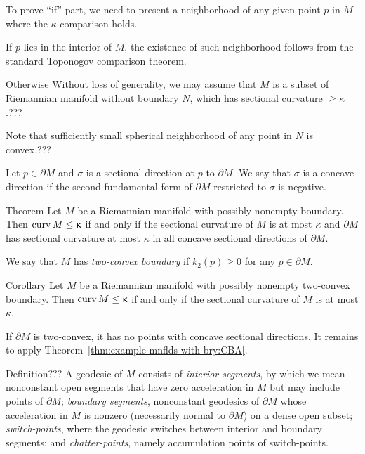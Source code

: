 To prove ``if'' part, we need to present a neighborhood of any given point $p$ in $M$ where the $\kappa$-comparison holds.

If $p$ lies in the interior of $M$, 
the existence of such neighborhood 
follows from the standard Toponogov comparison theorem.

Otherwise 
Without loss of generality, we may assume that $M$ 
is a subset of Riemannian manifold without boundary $N$, 
which has sectional curvature $\ge \kappa$.???

Note that sufficiently small spherical neighborhood of 
any point in $N$ is convex.???\qeds


Let $p\in\partial M$ and $\sigma$ is a sectional direction at $p$ to $\partial M$.
We say that $\sigma$ is a concave direction if the second fundamental form of $\partial M$ restricted to $\sigma$ is negative.

\begin{thm}{Theorem}\label{thm:example-mnflds-with-bry:CBA}
Let $M$ be a Riemannian manifold with possibly nonempty boundary.
Then
$\curv M\le \kappa$
if and only if the sectional curvature of $M$ is at most $\kappa$
and $\partial M$ has sectional curvature at most $\kappa$ 
in all concave sectional directions of $\partial M$.
\end{thm}

We say that $M$ has \emph{two-convex boundary} 
if $k_2(p)\ge 0$ for any $p\in\partial M$.

%

\begin{thm}{Corollary}
Let $M$ be a Riemannian manifold with possibly nonempty two-convex boundary.
Then $\curv M\le{\kappa}$ 
if and only if the sectional curvature of $M$ is at most $\kappa$.
\end{thm}

If $\partial M$ is two-convex, 
it has no points with concave sectional directions.
It remains to apply Theorem~\ref{thm:example-mnflds-with-bry:CBA}.
\qeds

\begin{thm}{Definition}\label{def:mwb-segment}??? A geodesic of $M$ consists of  \emph{interior
segments}, by which we mean nonconstant open segments  that have zero acceleration in $M$ but
may include points of $\partial M$;  \emph{boundary segments}, nonconstant geodesics of $\partial M$ whose acceleration in $M$ is nonzero (necessarily normal to $\partial M$) on a dense open subset; \emph{switch-points}, where the geodesic switches between interior and boundary segments;  and \emph{chatter-points}, namely accumulation points of switch-points. 
\end{thm}

